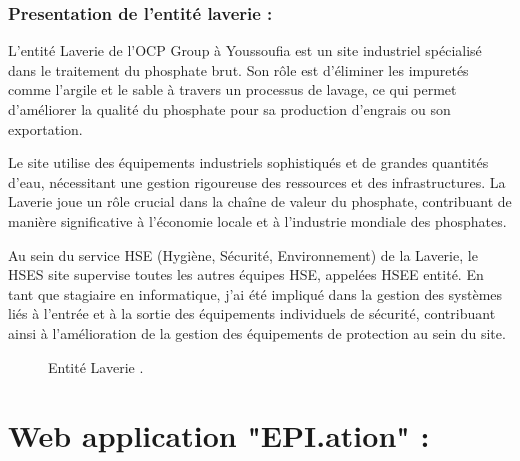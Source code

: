 \documentclass[a4paper,12pt]{report}
\begin{document}
\subsection{Presentation de l'entité laverie :}
L'entité Laverie de l'OCP Group à Youssoufia est un site industriel spécialisé dans le traitement du phosphate brut. Son rôle est d'éliminer les impuretés comme l'argile et le sable à travers un processus de lavage, ce qui permet d'améliorer la qualité du phosphate pour sa production d’engrais ou son exportation.

Le site utilise des équipements industriels sophistiqués et de grandes quantités d'eau, nécessitant une gestion rigoureuse des ressources et des infrastructures. La Laverie joue un rôle crucial dans la chaîne de valeur du phosphate, contribuant de manière significative à l'économie locale et à l'industrie mondiale des phosphates.

Au sein du service HSE (Hygiène, Sécurité, Environnement) de la Laverie, le HSES site supervise toutes les autres équipes HSE, appelées HSEE entité. En tant que stagiaire en informatique, j'ai été impliqué dans la gestion des systèmes liés à l'entrée et à la sortie des équipements individuels de sécurité, contribuant ainsi à l'amélioration de la gestion des équipements de protection au sein du site.
\begin{figure}[h]
    \centering
    \caption{Entité Laverie .}
    \label{fig:mon_image}
\end{figure}





\chapter*{Web application "EPI.ation" :}
\end{document}
